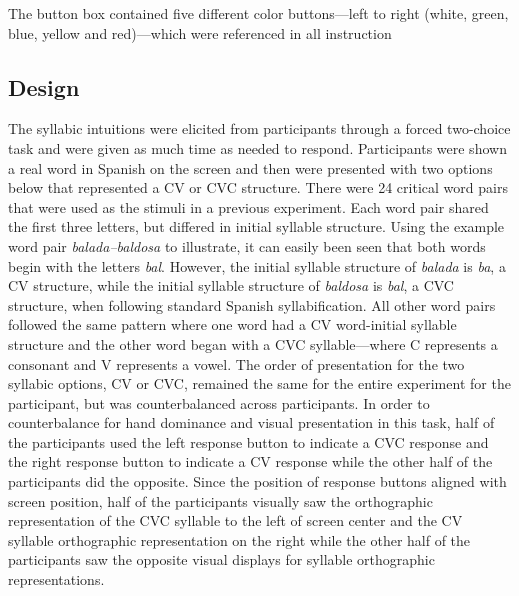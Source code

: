 \documentclass[
12pt, %
english, %
doublespacing, %
nolistspacing, %
liststotoc, %
headsepline, %
chapterinoneline, %
openany, %
]{DoctoralThesis}\usepackage[]{graphicx}\usepackage[]{color}
\begin{document}
The button box contained five different color buttons---left to right (white, green, blue, yellow and red)---which were referenced in all instruction 




\subsection{Design}
The syllabic intuitions were elicited from participants through a forced two-choice task and were given as much time as needed to respond. Participants were shown a real word in Spanish on the screen and then were presented with two options below that represented a CV or CVC structure. There were 24 critical word pairs that were used as the stimuli in a previous experiment. Each word pair shared the first three letters, but differed in initial syllable structure. Using the example word pair \emph{balada–baldosa} to illustrate, it can easily been seen that both words begin with the letters \emph{bal}. However, the initial syllable structure of \emph{balada} is \emph{ba}, a CV structure, while the initial syllable structure of \emph{baldosa} is \emph{bal}, a CVC structure, when following standard Spanish syllabification. All other word pairs followed the same pattern where one word had a CV word-initial syllable structure and the other word began with a CVC syllable---where C represents a consonant and V represents a vowel. The order of presentation for the two syllabic options, CV or CVC, remained the same for the entire experiment for the participant, but was counterbalanced across participants. In order to counterbalance for hand dominance and visual presentation in this task, half of the participants used the left response button to indicate a CVC response and the right response button to indicate a CV response while the other half of the participants did the opposite. Since the position of response buttons aligned with screen position, half of the participants visually saw the orthographic representation of the CVC syllable to the left of screen center and the CV syllable orthographic representation on the right while the other half of the participants saw the opposite visual displays for syllable orthographic representations.
\end{document}
